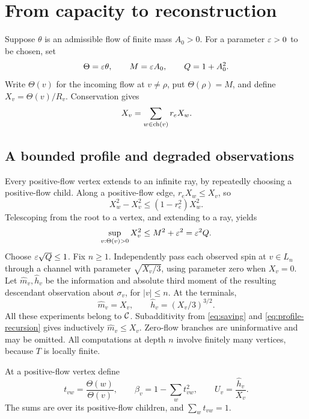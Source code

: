 \section{From capacity to reconstruction}\label{sec:sufficiency}

Suppose $\theta$ is an admissible flow of finite mass $A_0>0$.
For a parameter $\varepsilon>0$ to be chosen, set
\[
 \Theta=\varepsilon\theta,\qquad M=\varepsilon A_0,\qquad Q=1+A_0^2.
\]
Write $\Theta(v)$ for the incoming flow at $v\ne\rho$, put
$\Theta(\rho)=M$, and define $X_v=\Theta(v)/R_v$. Conservation gives
\begin{equation}\label{eq:profile-recursion}
 X_v=\sum_{w\in\operatorname{ch}(v)}r_eX_w.
\end{equation}

\subsection{A bounded profile and degraded observations}
Every positive-flow vertex extends to an infinite ray, by repeatedly
choosing a positive-flow child. Along a positive-flow edge,
$r_eX_w\leq X_v$, so
\[
 X_w^2-X_v^2\leq(1-r_e^2)X_w^2.
\]
Telescoping from the root to a vertex, and extending to a ray, yields
\begin{equation}\label{eq:profile}
 \sup_{v:\Theta(v)>0}X_v^2\leq M^2+\varepsilon^2=\varepsilon^2Q.
\end{equation}
Choose $\varepsilon\sqrt Q\leq1$. Fix $n\geq1$. Independently pass
each observed spin at $v\in L_n$ through a channel with parameter
$\sqrt{X_v/3}$, using parameter zero when $X_v=0$.
Let $\widehat m_v,\widehat h_v$ be the information and absolute
third moment of the resulting descendant observation about
$\sigma_v$, for $|v|\leq n$. At the terminals,
\begin{equation}\label{eq:terminal}
 \widehat m_v=X_v,\qquad
 \widehat h_v=(X_v/3)^{3/2}.
\end{equation}
All these experiments belong to $\mathcal C$. Subadditivity from
\eqref{eq:saving} and \eqref{eq:profile-recursion} gives inductively
$\widehat m_v\leq X_v$. Zero-flow branches are uninformative and
may be omitted. All computations at depth $n$ involve finitely many
vertices, because $T$ is locally finite.

At a positive-flow vertex define
\begin{equation}\label{eq:splits}
 t_{vw}=\frac{\Theta(w)}{\Theta(v)},\qquad
 \beta_v=1-\sum_w t_{vw}^2,\qquad
 U_v=\frac{\widehat h_v}{X_v}.
\end{equation}
The sums are over its positive-flow children, and $\sum_w t_{vw}=1$.

